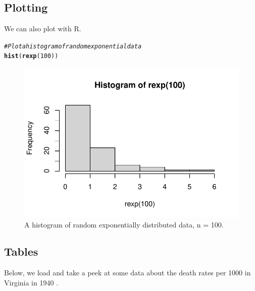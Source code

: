 \documentclass{article}\usepackage[]{graphicx}\usepackage[]{xcolor}
\makeatletter
\def\maxwidth{ %
  \ifdim\Gin@nat@width>\linewidth
    \linewidth
  \else
    \Gin@nat@width
  \fi
}
\newcommand{\hlnum}[1]{\textcolor[rgb]{0.686,0.059,0.569}{#1}}%
\newcommand{\hlcom}[1]{\textcolor[rgb]{0.678,0.584,0.686}{\textit{#1}}}%
\newcommand{\hldef}[1]{\textcolor[rgb]{0.345,0.345,0.345}{#1}}%
\newcommand{\hlkwd}[1]{\textcolor[rgb]{0.737,0.353,0.396}{\textbf{#1}}}%
\newenvironment{kframe}{%
 \def\at@end@of@kframe{}%
 \ifinner\ifhmode%
  \def\at@end@of@kframe{\end{minipage}}%
  \begin{minipage}{\columnwidth}%
 \fi\fi%
 \def\FrameCommand##1{\hskip\@totalleftmargin \hskip-\fboxsep
 \colorbox{shadecolor}{##1}\hskip-\fboxsep
     \hskip-\linewidth \hskip-\@totalleftmargin \hskip\columnwidth}%
 \MakeFramed {\advance\hsize-\width
   \@totalleftmargin\z@ \linewidth\hsize
   \@setminipage}}%
 {\par\unskip\endMakeFramed%
 \at@end@of@kframe}
\newenvironment{knitrout}{}{} %
\makeatother
\begin{document}
\begin{multicols}{2}
\subsection{Plotting}
We can also plot with R.
\begin{knitrout}\scriptsize
{}\color{fgcolor}\begin{kframe}
\begin{alltt}
\hlcom{#Plot a histogram of random exponential data}
\hlkwd{hist}\hldef{(}\hlkwd{rexp}\hldef{(}\hlnum{100}\hldef{))}
\end{alltt}
\end{kframe}
\end{knitrout}
\begin{figure}[H]
\begin{center}
\begin{knitrout}
\color{fgcolor}
\includegraphics[width=\maxwidth]{figure/unnamed-chunk-6-1} 
\end{knitrout}
\caption{A histogram of random exponentially distributed data, n = 100.}
\label{plot1} %
\end{center}
\end{figure}
\columnbreak

\subsection{Tables}
Below, we load and take a peek at some data about the death rates per 1000 in Virginia in 1940 \citep{molyneaux1947differences}.


\end{multicols}
\end{document}
